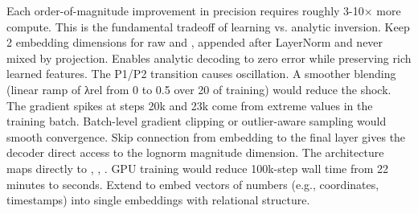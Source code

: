 {}Each order-of-magnitude improvement in precision requires roughly 3-10× more compute. This is the fundamental tradeoff of learning vs. analytic inversion.\markdownRendererInterblockSeparator
{}\markdownRendererThematicBreak{}\markdownRendererInterblockSeparator
{}
\markdownRendererSectionEnd 
\markdownRendererSectionEnd \markdownRendererSectionBegin
{}\markdownRendererInterblockSeparator
{}\markdownRendererSectionBegin
{}\markdownRendererInterblockSeparator
{}\markdownRendererUlBeginTight
\markdownRendererUlItem {} Keep 2 embedding dimensions for raw  and , appended after LayerNorm and never mixed by projection. Enables analytic decoding to zero error while preserving rich learned features.\markdownRendererUlItemEnd 
\markdownRendererUlItem {} The P1/P2 transition causes oscillation. A smoother blending (linear ramp of λ\markdownRendererUnderscore{}rel from 0 to 0.5 over 20\markdownRendererPercentSign{} of training) would reduce the shock.\markdownRendererUlItemEnd 
\markdownRendererUlItem {} The gradient spikes at steps \markdownRendererTilde{}20k and \markdownRendererTilde{}23k come from extreme values in the training batch. Batch-level gradient clipping or outlier-aware sampling would smooth convergence.\markdownRendererUlItemEnd 
\markdownRendererUlEndTight \markdownRendererInterblockSeparator
{}
\markdownRendererSectionEnd \markdownRendererSectionBegin
{}\markdownRendererInterblockSeparator
{}\markdownRendererUlBeginTight
\markdownRendererUlItem {} Skip connection from embedding to the final layer gives the decoder direct access to the log\markdownRendererUnderscore{}norm magnitude dimension.\markdownRendererUlItemEnd 
\markdownRendererUlItem {} The architecture maps directly to , , . GPU training would reduce 100k-step wall time from \markdownRendererTilde{}22 minutes to seconds.\markdownRendererUlItemEnd 
\markdownRendererUlItem {} Extend to embed vectors of numbers (e.g., coordinates, timestamps) into single embeddings with relational structure.\markdownRendererUlItemEnd 
